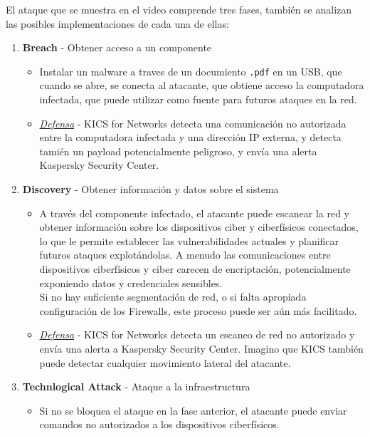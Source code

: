 El ataque que se muestra en el video comprende tres fases, también se analizan las posibles implementaciones de cada una de ellas:
\begin{enumerate}
   \item \textbf{Breach} - Obtener acceso a un componente
   \begin{itemize}
      \item Instalar un malware a traves de un documiento \texttt{.pdf} en un \textsc{USB}, que cuando se abre, se conecta al atacante, que obtiene acceso la computadora infectada, que puede utilizar como fuente para futuros ataques en la red.
      \item \textit{\ul{Defensa}} - KICS for Networks detecta una comunicación no autorizada entre la computadora infectada y una dirección IP externa, y detecta tamién un payload potencialmente peligroso, y envía una alerta Kaspersky Security Center.
   \end{itemize}
   \item \textbf{Discovery} - Obtener información y datos sobre el sistema
   \begin{itemize}
      \item A través del componente infectado, el atacante puede escanear la red y obtener información sobre los dispositivos ciber y ciberfísicos conectados, lo que le permite establecer las vulnerabilidades actuales y planificar futuros ataques explotándolas.
      A menudo las comunicaciones entre dispositivos ciberfísicos y ciber carecen de encriptación, potencialmente exponiendo datos y credenciales sensibles.\\
      Si no hay suficiente segmentación de red, o si falta apropiada configuración de los Firewalls, este proceso puede ser aún más facilitado.
      \item \textit{\ul{Defensa}} - KICS for Networks detecta un escaneo de red no autorizado y envía una alerta a Kaspersky Security Center. Imagino que KICS también puede detectar cualquier movimiento lateral del atacante.
   \end{itemize}
   \item \textbf{Technlogical Attack} - Ataque a la infraestructura
   \begin{itemize}
      \item Si no se bloquea el ataque en la fase anterior, el atacante puede enviar comandos no autorizados a los dispositivos ciberfísicos.\\

\end{itemize}
\end{enumerate}
